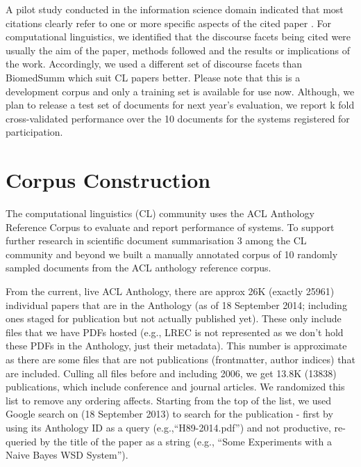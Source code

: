 \documentclass[11pt]{article}
\begin{document}

A pilot study conducted in the information science domain indicated that 
most citations clearly refer to one or more specific aspects of the cited 
paper \cite{jaidka2013}. For computational linguistics, we identified that 
the discourse facets being cited were usually the aim of the paper, methods 
followed and the results or implications of the work. Accordingly, we used a 
different set of discourse facets than BiomedSumm which suit CL papers better. 
Please note that this is a development corpus and only a training set is 
available for use now. Although, we plan to release a test set of documents 
for next year's evaluation, we report k fold cross-validated performance over 
the 10 documents for the systems registered for participation.

\section{Corpus Construction}
\label{corpus}
The computational linguistics (CL) community uses the ACL Anthology 
Reference Corpus \cite{bird2008} to evaluate and report performance of 
systems. To support further research in scientific document summarisation 3
among the CL community and beyond we built a manually annotated  corpus of 
10 randomly sampled documents  from the ACL anthology reference corpus.

From the current, live ACL Anthology, there are approx 26K (exactly 25961) 
individual papers that are in the Anthology (as of 18 September 2014; including 
ones staged for publication but not actually published yet). These only include 
files that we have PDFs hosted (e.g., LREC is not represented as we don't hold 
these PDFs in the Anthology, just their metadata). This number is approximate 
as there are some files that are not publications (frontmatter, author 
indices) that are included. Culling all files before and including 2006, we get 
13.8K (13838) publications, which include conference and journal articles. We 
randomized this list to remove any ordering affects. Starting from the top of 
the list, we used Google search on (18 September 2013) to search for the 
publication - first by using its Anthology ID as a query 
(e.g.,``H89-2014.pdf'') and not productive, re-queried by the title of the 
paper as a string (e.g., ``Some Experiments with a Naive Bayes WSD System'').
\end{document}
